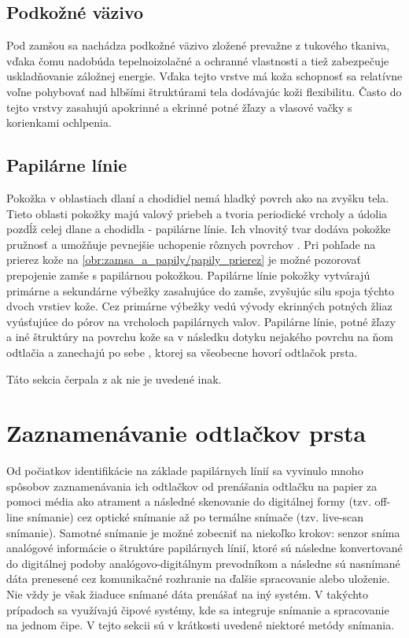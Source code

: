   \subsection{Podkožné väzivo}
  Pod zamšou sa nachádza podkožné väzivo zložené prevažne z tukového tkaniva, vďaka čomu nadobúda tepelnoizolačné a ochranné vlastnosti a tiež zabezpečuje
  uskladňovanie záložnej energie. Vďaka tejto vrstve má koža schopnosť sa relatívne voľne pohybovať nad hlbšími štruktúrami tela dodávajúc koži flexibilitu.
  Často do tejto vrstvy zasahujú apokrinné a ekrinné potné žľazy a vlasové vačky s korienkami ochlpenia.

  \subsection{Papilárne línie}
  Pokožka v oblastiach dlaní a chodidiel nemá hladký povrch ako na zvyšku tela. Tieto oblasti pokožky majú valový priebeh a tvoria periodické vrcholy
  a údolia pozdĺž celej dlane a chodidla - papilárne línie. Ich vlnovitý tvar dodáva pokožke pružnosť a umožňuje pevnejšie uchopenie rôznych povrchov
  \cite{FingerprintSrcBook}. Pri pohľade na prierez kože na \ref{obr:zamsa_a_papily/papily_prierez} je možné pozorovať prepojenie zamše s papilárnou pokožkou.
  Papilárne línie pokožky vytvárajú primárne a sekundárne výbežky zasahujúce do zamše, zvyšujúc silu spoja týchto dvoch vrstiev kože. Cez primárne výbežky
  vedú vývody ekrinných potných žliaz vyúsťujúce do pórov na vrcholoch papilárnych valov. Papilárne línie, potné žľazy
  a iné štruktúry na povrchu kože sa v následku dotyku nejakého povrchu na ňom odtlačia a zanechajú po sebe , 
  ktorej sa všeobecne hovorí odtlačok prsta.

  Táto sekcia čerpala z \cite{freinkel2001skin} ak nie je uvedené inak.

  \section{Zaznamenávanie odtlačkov prsta}
  Od počiatkov identifikácie na základe papilárnych línií sa vyvinulo mnoho spôsobov zaznamenávania ich odtlačkov od prenášania odtlačku na papier
  za pomoci média ako atrament a následné skenovanie do digitálnej formy (tzv. off-line snímanie) cez optické snímanie až po termálne snímače
  (tzv. live-scan snímanie). Samotné snímanie je možné zobecniť na niekoľko krokov: senzor sníma analógové informácie o štruktúre papilárnych línií,
  ktoré sú následne konvertované do digitálnej podoby analógovo-digitálnym prevodníkom a následne sú nasnímané dáta prenesené cez komunikačné rozhranie
  na ďalšie spracovanie alebo uloženie. Nie vždy je však žiaduce snímané dáta prenášať na iný systém. V takýchto prípadoch sa využívajú čipové systémy,
  kde sa integruje snímanie a spracovanie na jednom čipe.
  V tejto sekcii sú v krátkosti uvedené niektoré metódy snímania.

